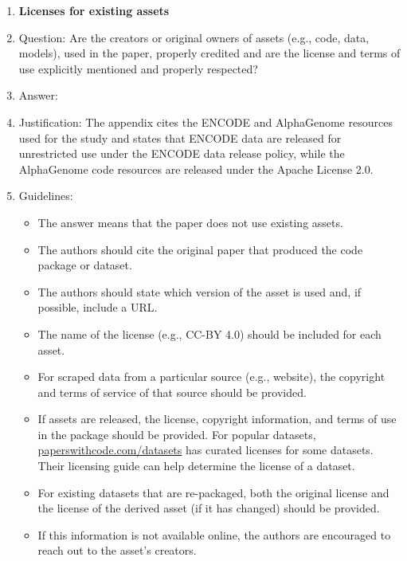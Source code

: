 \documentclass{article}
\begin{document}
\begin{enumerate}
\item {\bf Licenses for existing assets}
    \item[] Question: Are the creators or original owners of assets (e.g., code, data, models), used in the paper, properly credited and are the license and terms of use explicitly mentioned and properly respected?
    \item[] Answer: \answerYes{} %
    \item[] Justification: The appendix cites the ENCODE and AlphaGenome resources used for the study and states that ENCODE data are released for unrestricted use under the ENCODE data release policy, while the AlphaGenome code resources are released under the Apache License 2.0.
    \item[] Guidelines:
    \begin{itemize}
        \item The answer \answerNA{} means that the paper does not use existing assets.
        \item The authors should cite the original paper that produced the code package or dataset.
        \item The authors should state which version of the asset is used and, if possible, include a URL.
        \item The name of the license (e.g., CC-BY 4.0) should be included for each asset.
        \item For scraped data from a particular source (e.g., website), the copyright and terms of service of that source should be provided.
        \item If assets are released, the license, copyright information, and terms of use in the package should be provided. For popular datasets, \url{paperswithcode.com/datasets} has curated licenses for some datasets. Their licensing guide can help determine the license of a dataset.
        \item For existing datasets that are re-packaged, both the original license and the license of the derived asset (if it has changed) should be provided.
        \item If this information is not available online, the authors are encouraged to reach out to the asset's creators.
    \end{itemize}


\end{enumerate}
\end{document}
